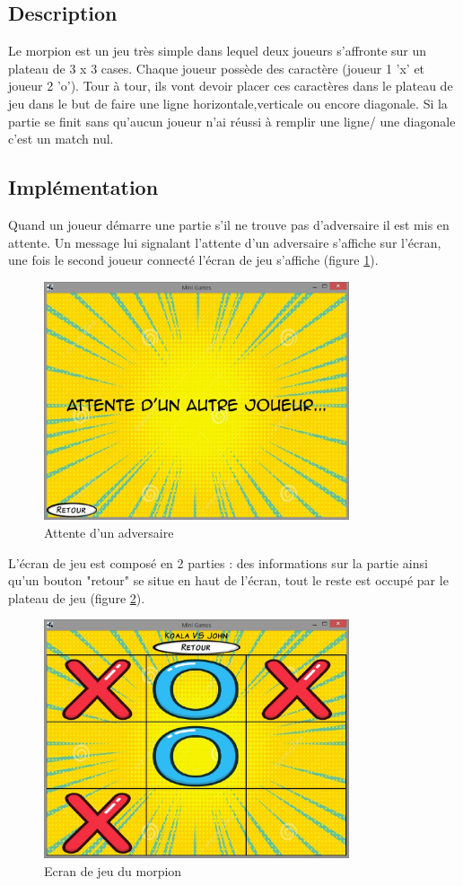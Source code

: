 \documentclass{report}
\begin{document}
\subsection{Description}
Le morpion est un jeu très simple dans lequel deux joueurs s'affronte sur un plateau de 3 x 3 cases. Chaque joueur possède des caractère (joueur 1 'x' et joueur 2 'o').
Tour à tour, ils vont devoir placer ces caractères dans le plateau de jeu dans le but de faire une ligne horizontale,verticale ou encore diagonale.
Si la partie se finit sans qu'aucun joueur n'ai réussi à remplir une ligne/ une diagonale c'est un match nul.
\subsection{Implémentation}

Quand un joueur démarre une partie s'il ne trouve pas d'adversaire il est mis en attente. Un message lui signalant l'attente d'un
adversaire s'affiche sur l'écran, une fois le second joueur connecté l'écran de jeu s'affiche (figure \ref{attente_adversaire}).

\begin{figure}[H]
	\centering\includegraphics[width=9cm]{morpionwaiting}
	\caption{Attente d'un adversaire}
  \label{attente_adversaire}
\end{figure}

L'écran de jeu est composé en 2 parties : des informations sur la partie ainsi qu'un bouton "retour" se situe en haut
de l'écran, tout le reste est occupé par le plateau de jeu (figure \ref{morpion_en_jeu}).

\begin{figure}[H]
	\centering\includegraphics[width=9cm]{morpioningame}
	\caption{Ecran de jeu du morpion}
  \label{morpion_en_jeu}
\end{figure}
\end{document}
